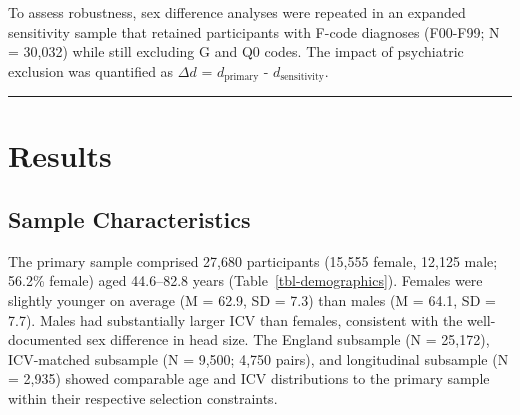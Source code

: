 \documentclass[
]{article}
\begin{document}
To assess robustness, sex difference analyses were repeated in an
expanded sensitivity sample that retained participants with F-code
diagnoses (F00-F99; N = 30,032) while still excluding G and Q0 codes.
The impact of psychiatric exclusion was quantified as \(\Delta d\) =
\(d_{\text{primary}}\) - \(d_{\text{sensitivity}}\).

\begin{center}\rule{0.5\linewidth}{0.5pt}\end{center}

\section{Results}\label{results}

\subsection{Sample Characteristics}\label{sample-characteristics}

The primary sample comprised 27,680 participants (15,555 female, 12,125
male; 56.2\% female) aged 44.6--82.8 years
(Table~\ref{tbl-demographics}). Females were slightly younger on average
(M = 62.9, SD = 7.3) than males (M = 64.1, SD = 7.7). Males had
substantially larger ICV than females, consistent with the
well-documented sex difference in head size. The England subsample (N =
25,172), ICV-matched subsample (N = 9,500; 4,750 pairs), and
longitudinal subsample (N = 2,935) showed comparable age and ICV
distributions to the primary sample within their respective selection
constraints.
\end{document}
